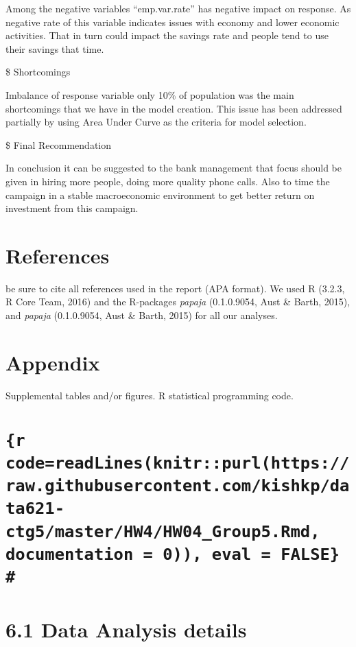 \documentclass[english,floatsintext,man]{apa6}
\begin{document}
Among the negative variables \enquote{emp.var.rate} has negative impact
on response. As negative rate of this variable indicates issues with
economy and lower economic activities. That in turn could impact the
savings rate and people tend to use their savings that time.

\$ Shortcomings

Imbalance of response variable only 10\% of population was the main
shortcomings that we have in the model creation. This issue has been
addressed partially by using Area Under Curve as the criteria for model
selection.

\$ Final Recommendation

In conclusion it can be suggested to the bank management that focus
should be given in hiring more people, doing more quality phone calls.
Also to time the campaign in a stable macroeconomic environment to get
better return on investment from this campaign.

\section{References}\label{references}

be sure to cite all references used in the report (APA format). We used
R (3.2.3, R Core Team, 2016) and the R-packages \emph{papaja}
(0.1.0.9054, Aust \& Barth, 2015), and \emph{papaja} (0.1.0.9054, Aust
\& Barth, 2015) for all our analyses.

\section{Appendix}\label{appendix}

Supplemental tables and/or figures. R statistical programming code.

\section{\texttt{\{r code=readLines(knitr::purl(\textquotesingle{}https://raw.githubusercontent.com/kishkp/data621-ctg5/master/HW4/HW04\_Group5.Rmd\textquotesingle{}, documentation = 0)), eval = FALSE\} \#}}\label{r-codereadlinesknitrpurlhttpsraw.githubusercontent.comkishkpdata621-ctg5masterhw4hw04ux5fgroup5.rmd-documentation-0-eval-false}

\section{6.1 Data Analysis details}\label{data-analysis-details}
\end{document}
